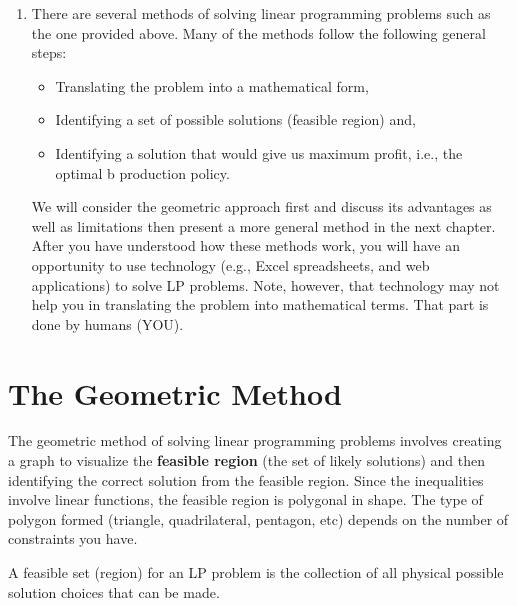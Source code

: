 \documentclass[
  letterpaper,
  DIV=11,
  numbers=noendperiod]{scrreprt}
\newenvironment{Shaded}{\begin{snugshade}}{\end{snugshade}}
\newcommand{\DataTypeTok}[1]{\textcolor[rgb]{0.68,0.00,0.00}{#1}}
\newcommand{\ErrorTok}[1]{\textcolor[rgb]{0.68,0.00,0.00}{#1}}
\newcommand{\KeywordTok}[1]{\textcolor[rgb]{0.00,0.23,0.31}{#1}}
\providecommand{\tightlist}{%
  \setlength{\itemsep}{0pt}\setlength{\parskip}{0pt}}\usepackage{longtable,booktabs,array}
\begin{document}
\begin{enumerate}
\def\labelenumi{\alph{enumi})}
\setcounter{enumi}{1}
\item
  There are several methods of solving linear programming problems such
  as the one provided above. Many of the methods follow the following
  general steps:

  \begin{itemize}
  \tightlist
  \item
    Translating the problem into a mathematical form,
  \item
    Identifying a set of possible solutions (feasible region) and,
  \item
    Identifying a solution that would give us maximum profit, i.e., the
    optimal b production policy.
  \end{itemize}

  We will consider the geometric approach first and discuss its
  advantages as well as limitations then present a more general method
  in the next chapter. After you have understood how these methods work,
  you will have an opportunity to use technology (e.g., Excel
  spreadsheets, and web applications) to solve LP problems. Note,
  however, that technology may not help you in translating the problem
  into mathematical terms. That part is done by humans (YOU).
\end{enumerate}

\hypertarget{the-geometric-method}{%
\section{The Geometric Method}\label{the-geometric-method}}

The geometric method of solving linear programming problems involves
creating a graph to visualize the \textbf{feasible region} (the set of
likely solutions) and then identifying the correct solution from the
feasible region. Since the inequalities involve linear functions, the
feasible region is polygonal in shape. The type of polygon formed
(triangle, quadrilateral, pentagon, etc) depends on the number of
constraints you have.

\begin{Shaded}
\begin{Highlighting}[]
\DataTypeTok{A} \DataTypeTok{feasible} \DataTypeTok{set} \ErrorTok{(}\DataTypeTok{region}\ErrorTok{)} \DataTypeTok{for} \DataTypeTok{an} \DataTypeTok{LP} \DataTypeTok{problem} \DataTypeTok{is} \DataTypeTok{the} \DataTypeTok{collection} \DataTypeTok{of} \DataTypeTok{all} \DataTypeTok{physical}
\DataTypeTok{possible} \DataTypeTok{solution} \DataTypeTok{choices} \DataTypeTok{that} \DataTypeTok{can} \DataTypeTok{be} \DataTypeTok{made}\KeywordTok{.} 
\end{Highlighting}
\end{Shaded}
\end{document}
